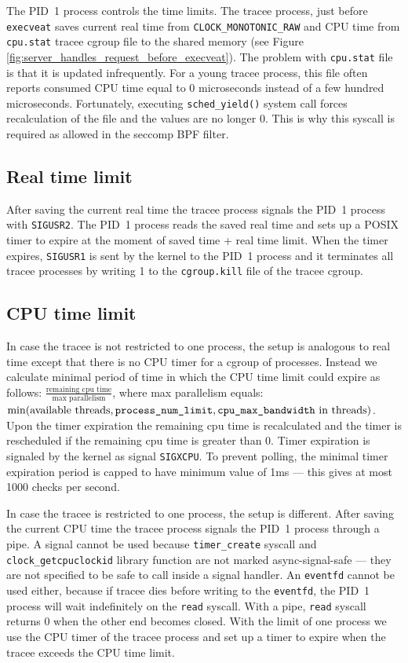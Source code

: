\documentclass[en]{pracamgr}
\begin{document}
The PID~1 process controls the time limits. The tracee process, just before \texttt{execveat} saves current real time from \texttt{CLOCK\_MONOTONIC\_RAW} and CPU time from \texttt{cpu.stat} tracee cgroup file to the shared memory (see Figure \ref{fig:server_handles_request_before_execveat}). The problem with \texttt{cpu.stat} file is that it is updated infrequently. For a young tracee process, this file often reports consumed CPU time equal to 0 microseconds instead of a few hundred microseconds. Fortunately, executing \texttt{sched\_yield()} system call forces recalculation of the file and the values are no longer 0. This is why this syscall is required as allowed in the seccomp BPF filter.

\subsection{Real time limit}

After saving the current real time the tracee process signals the PID~1 process with \texttt{SIGUSR2}. The PID~1 process reads the saved real time and sets up a POSIX timer to expire at the moment of saved time + real time limit. When the timer expires, \texttt{SIGUSR1} is sent by the kernel to the PID~1 process and it terminates all tracee processes by writing 1 to the \texttt{cgroup.kill} file of the tracee cgroup.

\subsection{CPU time limit}

In case the tracee is not restricted to one process, the setup is analogous to real time except that there is no CPU timer for a cgroup of processes. Instead we calculate minimal period of time in which the CPU time limit could expire as follows: $\frac{\text{remaining cpu time}}{\text{max parallelism}}$, where max parallelism equals: $\min(\text{available threads}, \text{\texttt{process\_num\_limit}}, \text{\texttt{cpu\_max\_bandwidth} in threads})$. Upon the timer expiration the remaining cpu time is recalculated and the timer is rescheduled if the remaining cpu time is greater than 0. Timer expiration is signaled by the kernel as signal \texttt{SIGXCPU}. To prevent polling, the minimal timer expiration period is capped to have minimum value of 1ms --- this gives at most 1000 checks per second.

In case the tracee is restricted to one process, the setup is different. After saving the current CPU time the tracee process signals the PID~1 process through a pipe. A signal cannot be used because \texttt{timer\_create} syscall and \texttt{clock\_getcpuclockid} library function are not marked async-signal-safe --- they are not specified to be safe to call inside a signal handler. An \texttt{eventfd} cannot be used either, because if tracee dies before writing to the \texttt{eventfd}, the PID~1 process will wait indefinitely on the \texttt{read} syscall. With a pipe, \texttt{read} syscall returns 0 when the other end becomes closed. With the limit of one process we use the CPU timer of the tracee process and set up a timer to expire when the tracee exceeds the CPU time limit.
\end{document}
